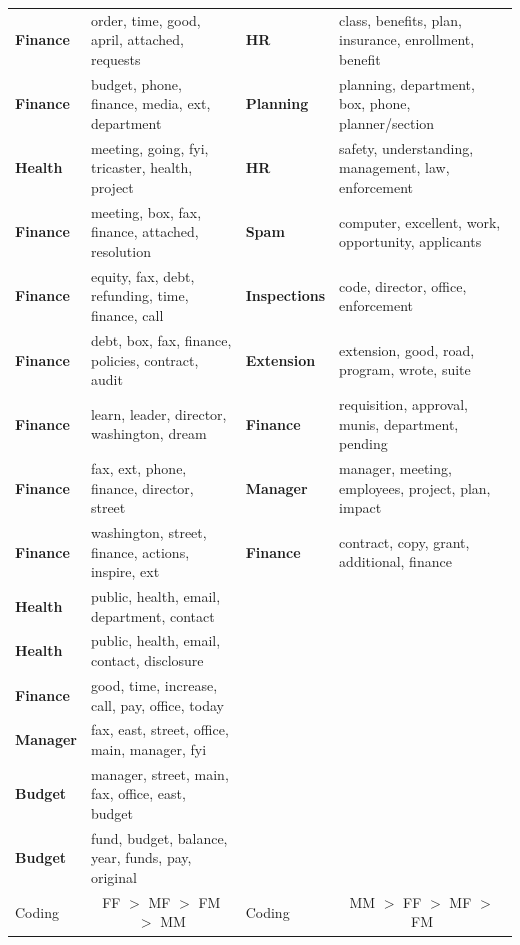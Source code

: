\documentclass{pnastwo}
\begin{document}
\begin{article}
\begin{table}
\begin{tabular}{lm{}|lm{}}
\textbf{Finance} & order, time, good, april, attached, requests
 &
\textbf{HR} & class, benefits, plan, insurance, enrollment, benefit\\ 
\textbf{Finance} & budget, phone, finance, media, ext, department
 &
\textbf{Planning} & planning, department, box, phone, planner/section\\ 
\textbf{Health} & meeting, going, fyi, tricaster, health, project
 &
\textbf{HR} & safety, understanding, management, law, enforcement\\ 
\textbf{Finance} & meeting, box, fax, finance, attached, resolution
 &
\textbf{Spam} & computer, excellent, work, opportunity, applicants\\ 
\textbf{Finance} & equity, fax, debt, refunding, time, finance, call
 &
\textbf{Inspections} & code, director, office, enforcement\\ 
\textbf{Finance} & debt, box, fax, finance, policies, contract, audit
 &
\textbf{Extension} & extension, good, road, program, wrote, suite\\ 
\textbf{Finance} & learn, leader, director, washington, dream
 &
\textbf{Finance} & requisition, approval, munis, department, pending\\ 
\textbf{Finance} & fax, ext, phone, finance, director, street
 &
\textbf{Manager} & manager, meeting, employees, project, plan, impact\\ 
\textbf{Finance} & washington, street, finance, actions, inspire, ext
 &
\textbf{Finance} & contract, copy, grant, additional, finance\\ 
\textbf{Health} & public, health, email, department, contact
 & &
\\ 
\textbf{Health} & public, health, email, contact, disclosure
 & &
\\ 
\textbf{Finance} & good, time, increase, call, pay, office, today
 & &
\\ 
\textbf{Manager} & fax, east, street, office, main, manager, fyi
 & &
\\ 
\textbf{Budget} & manager, street, main, fax, office, east, budget
 & &
\\ 
\textbf{Budget} & fund, budget, balance, year, funds, pay, original
 & &
\\ 


\midrule
Coding  & \multicolumn{1}{c}{FF $>$ MF $>$ FM $>$ MM}  & Coding & \multicolumn{1}{c}{MM $>$ FF $>$ MF $>$ FM} \\
 \midrule



\end{tabular}
\end{table}
\end{article}
\end{document}
